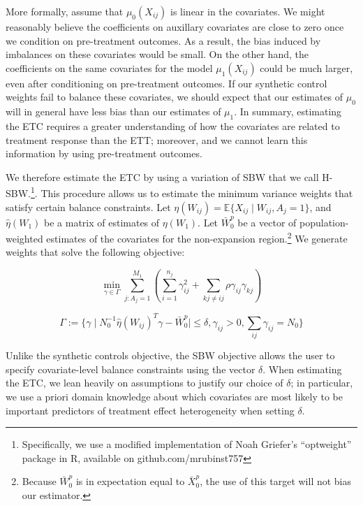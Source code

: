 \documentclass[12pt]{article}
\begin{document}
More formally, assume that $\mu_0(X_{ij})$ is linear in the covariates. We might reasonably believe the coefficients on auxillary covariates are close to zero once we condition on pre-treatment outcomes. As a result, the bias induced by imbalances on these covariates would be small. On the other hand, the coefficients on the same covariates for the model $\mu_1(X_{ij})$ could be much larger, even after conditioning on pre-treatment outcomes. If our synthetic control weights fail to balance these covariates, we should expect that our estimates of $\mu_0$ will in general have less bias than our estimates of $\mu_1$. In summary, estimating the ETC requires a greater understanding of how the covariates are related to treatment response than the ETT; moreover, and we cannot learn this information by using pre-treatment outcomes.

We therefore estimate the ETC by using a variation of SBW that we call H-SBW.\footnote{Specifically, we use a modified implementation of Noah Griefer's ``optweight'' package in R, available on github.com/mrubinst757}. This procedure allows us to estimate the minimum variance weights that satisfy certain balance constraints. Let $\eta(W_{ij}) = \mathbb{E}\{X_{ij} \mid W_{ij}, A_j = 1\}$, and $\hat{\eta}(W_1)$ be a matrix of estimates of $\eta(W_1)$. Let $\bar{W}_0^p$ be a vector of population-weighted estimates of the covariates for the non-expansion region.\footnote{Because $\bar{W}_0^p$ is in expectation equal to $\bar{X}_0^p$, the use of this target will not bias our estimator.} We generate weights that solve the following objective:

$$
\min_{\gamma \in \Gamma} \sum_{j: A_j = 1}^{M_1}(\sum_{i = 1}^{n_j} \gamma_{ij}^2 + \sum_{kj \ne ij}\rho \gamma_{ij}\gamma_{kj})
$$

$$
\Gamma := \{\gamma \mid N_0^{-1}\hat{\eta}(W_{ij})^T\gamma - \bar{W}_0^p \mid \le \delta, \gamma_{ij} > 0, \sum_{ij}\gamma_{ij} = N_0\}
$$

Unlike the synthetic controls objective, the SBW objective allows the user to specify covariate-level balance constraints using the vector $\delta$. When estimating the ETC, we lean heavily on assumptions to justify our choice of $\delta$; in particular, we use a priori domain knowledge about which covariates are most likely to be important predictors of treatment effect heterogeneity when setting $\delta$. 
\end{document}
